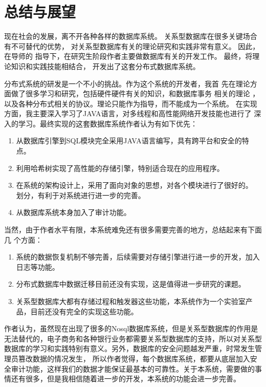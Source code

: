 \chapter{总结与展望}
现在社会的发展，离不开各种各样的数据库系统。
关系型数据库在很多关键场合有不可替代的优势，
对关系型数据库有关的理论研究和实践非常有意义。
因此，在导师的
指导下，在研究生阶段作者主要做数据库有关的开发工作。
最终，将理论知识和实践技能相结合，
开发出了这套分布式数据库系统。

分布式系统的研发是一个不小的挑战。作为这个系统的开发者，我首
先在理论方面做了很多学习和研究，包括硬件硬件有关的知识，和数据库事务
相关的理论
，以及各种分布式相关的协议。理论只能作为指导，而不能成为一个系统。
在实现方面，我主要深入学习了JAVA语言，对多线程和高性能网络开发技能也进行了
深入的学习。最终实现的这套数据库系统作者认为有如下优先：
\begin{enumerate}
	\item 从数据库引擎到SQL模块完全采用JAVA语言编写，具有跨平台和安全的特点。
	\item 利用哈希树实现了高性能的存储引擎，特别适合现在的应用程序。
	\item 在系统的架构设计上，采用了面向对象的思想，对各个模块进行了很好的。
	划分，有利于对系统进行进一步的完善。
	\item 从数据库系统本身加入了审计功能。
\end{enumerate}

当然，由于作者水平有限，本系统难免还有很多需要完善的地方，总结起来有下面几
个方面：
\begin{enumerate}
 \item 系统的数据恢复机制不够完善，后续需要对存储引擎进行进一步的开发，加入日志等功能。
\item 分布式数据库中数据迁移目前还没有实现，这是值得进一步研究的课题。
\item 关系型数据库大都有存储过程和触发器这些功能，本系统作为一个实验室产品，目前还没有完全的实现这些功能。
\end{enumerate}

作者认为，虽然现在出现了很多的Nosql数据库系统，但是关系型数据库的作用是无法替代的，电子商务和各种银行业务都需要关系型数据库的支持，所以对关系型数据库的学习和实践特别有意义。另外，数据库的安全问题越发严重，时常发生管理员篡改数据的情况发生，
所以作者觉得，每个数据库系统，都要从底层加入安全审计功能，这样我们的数据才能保证最基本的可靠性。关于本系统，需要做的事情还有很多，但是我相信随着进一步的开发，本系统的功能会进一步完善。
